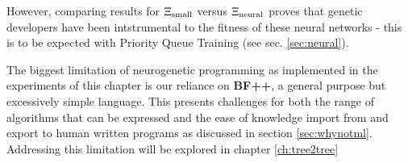 However, comparing results for $\Xi_\text{small}$ versus $\Xi_\text{neural}$ proves that genetic developers have been intstrumental to the fitness of these neural networks - this is to be expected with Priority Queue Training (see sec. \ref{sec:neural}).

The biggest limitation of neurogenetic programming as implemented in the experiments of this chapter is our reliance on \textbf{BF++}, a general purpose but excessively simple language.
This presents challenges for both the range of algorithms that can be expressed and the ease of knowledge import from and export to human written programs as discussed in section \ref{sec:whynotml}.
Addressing this limitation will be explored in chapter \ref{ch:tree2tree}